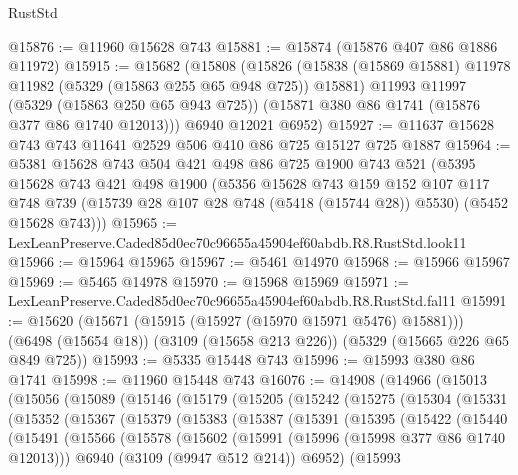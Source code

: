 \begin{lexlean}{RustStd}
\begin{coremodule}
@15876 := @11960 @15628 @743
@15881 := @15874 (@15876 @407 @86 @1886 @11972)
@15915 := @15682
    (@15808
      (@15826
        (@15838 (@15869 @15881) @11978 @11982 (@5329 (@15863 @255 @65 @948 @725)) @15881)
        @11993
        @11997
        (@5329 (@15863 @250 @65 @943 @725))
        (@15871 @380 @86 @1741 (@15876 @377 @86 @1740 @12013)))
      @6940
      @12021
      @6952)
@15927 := @11637 @15628 @743 @743 @11641 @2529 @506 @410 @86 @725 @15127 @725 @1887
@15964 := @5381
    @15628
    @743
    @504
    @421
    @498
    @86
    @725
    @1900
    @743
    @521
    (@5395
      @15628
      @743
      @421
      @498
      @1900
      (@5356
        @15628
        @743
        @159
        @152
        @107
        @117
        @748
        @739
        (@15739 @28 @107 @28 @748 (@5418 (@15744 @28)) @5530)
        (@5452 @15628 @743)))
@15965 := LexLeanPreserve.Caded85d0ec70c96655a45904ef60abdb.R8.RustStd.look11
@15966 := @15964 @15965
@15967 := @5461 @14970
@15968 := @15966 @15967
@15969 := @5465 @14978
@15970 := @15968 @15969
@15971 := LexLeanPreserve.Caded85d0ec70c96655a45904ef60abdb.R8.RustStd.fal11
@15991 := @15620
    (@15671 (@15915 (@15927 (@15970 @15971 @5476) @15881)))
    (@6498 (@15654 @18))
    (@3109 (@15658 @213 @226))
    (@5329 (@15665 @226 @65 @849 @725))
@15993 := @5335 @15448 @743
@15996 := @15993 @380 @86 @1741
@15998 := @11960 @15448 @743
@16076 := @14908
    (@14966
      (@15013
        (@15056
          (@15089
            (@15146
              (@15179
                (@15205
                  (@15242
                    (@15275
                      (@15304
                        (@15331
                          (@15352
                            (@15367
                              (@15379
                                (@15383
                                  (@15387
                                    (@15391
                                      (@15395
                                        (@15422
                                          (@15440
                                            (@15491
                                              (@15566
                                                (@15578
                                                  (@15602
                                                    (@15991 (@15996 (@15998 @377 @86 @1740 @12013)))
                                                    @6940
                                                    (@3109 (@9947 @512 @214))
                                                    @6952)
                                                  (@15993

\end{coremodule}
\end{lexlean}
